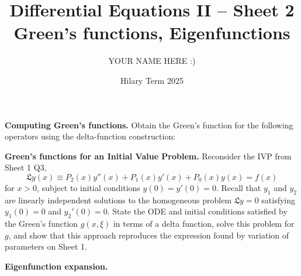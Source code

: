 \documentclass[answers]{exam}
\title{Differential Equations II -- Sheet 2\\Green's functions, Eigenfunctions}
\author{YOUR NAME HERE :)}
\date{Hilary Term 2025}
\begin{document}
\maketitle
\begin{questions}

\question%
\textbf{Computing Green's functions.} Obtain the Green's function for the following operators using the delta-function construction:



\question%
\textbf{Green's functions for an Initial Value Problem.} Reconsider the IVP from Sheet 1 Q3, \[
	\mathfrak{L} y(x) \equiv P_{2}(x) y''(x)+P_{1}(x) y'(x)+P_{0}(x) y(x)=f(x)
\] for $x>0$, subject to initial conditions $y(0)=y'(0)=0$. Recall that $y_{1}$ and $y_{2}$ are linearly independent solutions to the homogeneous problem $\mathfrak{L} y=0$ satisfying $y_{1}(0)=0$ and $y_{2}'(0)=0$. State the ODE and initial conditions satisfied by the Green's function $g(x, \xi)$ in terms of a delta function, solve this problem for $g$, and show that this approach reproduces the expression found by variation of parameters on Sheet 1.



\question%
\textbf{Eigenfunction expansion.}
\end{questions}
\end{document}
